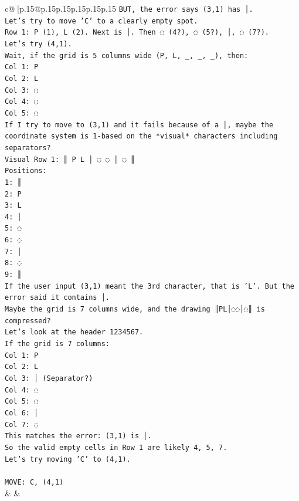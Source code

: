 \documentclass{article}
\begin{document}
{\begin{supertabular}{c@{$\;$}|p{.15\linewidth}@{}p{.15\linewidth}p{.15\linewidth}p{.15\linewidth}p{.15\linewidth}p{.15\linewidth}}
{{{\texttt{BUT, the error says (3,1) has │.} \\
\texttt{Let's try to move 'C' to a clearly empty spot.} \\
\texttt{Row 1: P (1), L (2). Next is │. Then ◌ (4?), ◌ (5?), │, ◌ (7?).} \\
\texttt{Let's try (4,1).} \\
\texttt{Wait, if the grid is 5 columns wide (P, L, \_, \_, \_), then:} \\
\texttt{Col 1: P} \\
\texttt{Col 2: L} \\
\texttt{Col 3: ◌} \\
\texttt{Col 4: ◌} \\
\texttt{Col 5: ◌} \\
\texttt{If I try to move to (3,1) and it fails because of a │, maybe the coordinate system is 1{-}based on the *visual* characters including separators?} \\
\texttt{Visual Row 1: ║ P L │ ◌ ◌ │ ◌ ║} \\
\texttt{Positions:} \\
\texttt{1: ║} \\
\texttt{2: P} \\
\texttt{3: L} \\
\texttt{4: │} \\
\texttt{5: ◌} \\
\texttt{6: ◌} \\
\texttt{7: │} \\
\texttt{8: ◌} \\
\texttt{9: ║} \\
\texttt{If the user input (3,1) meant the 3rd character, that is 'L'. But the error said it contains │.} \\
\texttt{Maybe the grid is 7 columns wide, and the drawing ║PL│◌◌│◌║ is compressed?} \\
\texttt{Let's look at the header 1234567.} \\
\texttt{If the grid is 7 columns:} \\
\texttt{Col 1: P} \\
\texttt{Col 2: L} \\
\texttt{Col 3: │ (Separator?)} \\
\texttt{Col 4: ◌} \\
\texttt{Col 5: ◌} \\
\texttt{Col 6: │} \\
\texttt{Col 7: ◌} \\
\texttt{This matches the error: (3,1) is │.} \\
\texttt{So the valid empty cells in Row 1 are likely 4, 5, 7.} \\
\texttt{Let's try moving 'C' to (4,1).} \\
\\ 
\texttt{MOVE: C, (4,1)} \\
            }
        }
    }
    & & \\ \\


\end{supertabular}}
\end{document}

